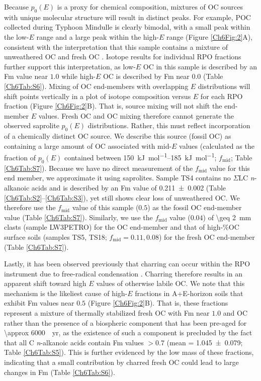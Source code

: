 Because $p_{0}(E)$ is a proxy for chemical composition, mixtures of OC sources with unique molecular structure will result in distinct peaks. For example, POC collected during Typhoon Mindulle is clearly bimodal, with a small peak within the low-$E$ range and a large peak within the high-$E$ range (Figure \ref{Ch6Fig:2}A), consistent with the interpretation that this sample contains a mixture of unweathered OC and fresh OC \citep{Hilton:2008fo}. Isotope results for individual RPO fractions further support this interpretation, as low-$E$ OC in this sample is described by an Fm value near $1.0$ while high-$E$ OC is described by Fm near $0.0$ (Table \ref{Ch6Tab:S6}). Mixing of OC end-members with overlapping $E$ distributions will shift points vertically in a plot of isotope composition versus $E$ for each RPO fraction (Figure \ref{Ch6Fig:2}B). That is, source mixing will not shift the end-member $E$ values. Fresh OC and OC mixing therefore cannot generate the observed saprolite $p_{0}(E)$ distributions. Rather, this must reflect incorporation of a chemically distinct OC source. We describe this source (fossil OC) as containing a large amount of OC associated with mid-$E$ values (calculated as the fraction of $p_{0}(E)$ contained between \SIrange{150}{185}{kJ.mol^{-1}}; $f_{\text{mid}}$; Table \ref{Ch6Tab:S7}). Because we have no direct measurement of the $f_{\text{mid}}$ value for this end member, we approximate it using saprolites. Sample TS4 contains no $\Sigma$LC \textit{n}-alkanoic acids and is described by an Fm value of \num{0.211 \pm 0.002} (Table \ref{Ch6Tab:S2}--\ref{Ch6Tab:S3}), yet still shows clear loss of unweathered OC. We therefore use the $f_{\text{mid}}$ value of this sample ($0.5$) as the fossil OC end-member value (Table \ref{Ch6Tab:S7}). Similarly, we use the $f_{\text{mid}}$ value ($0.04$) of \SI{\geq 2}{mm} clasts (sample LW3PETRO) for the OC end-member and that of high-\%OC surface soils (samples TS5, TS18; $f_{\text{mid}} = 0.11, 0.08$) for the fresh OC end-member (Table \ref{Ch6Tab:S7}).

Lastly, it has been observed previously that charring can occur within the RPO instrument due to free-radical condensation \citep[Chapter \ref{Ch3}]{Williams:2014bq}. Charring therefore results in an apparent shift toward high $E$ values of otherwise labile OC. We note that this mechanism is the likeliest cause of high-$E$ fractions in A+E-horizon soils that exhibit Fm values near $0.5$ (Figure \ref{Ch6Fig:2}B). That is, these fractions represent a mixture of thermally stabilized fresh OC with Fm near $1.0$ and OC rather than the presence of a biospheric component that has been pre-aged for \SI{\approx 6000}{.yr}, as the existence of such a component is precluded by the fact that all C \textit{n}-alkanoic acids contain Fm values $> 0.7$ (mean = \num{1.045 \pm 0.079}; Table \ref{Ch6Tab:S5}). This is further evidenced by the low mass of these fractions, indicating that a small contribution by charred fresh OC \citep[\SI{\approx 5}{\%} of low-$E$ material;][]{Williams:2014bq} could lead to large changes in Fm (Table \ref{Ch6Tab:S6}).

